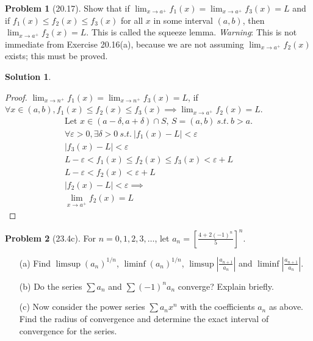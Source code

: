 \documentclass[12pt]{article}
\theoremstyle{definition} %
\newtheorem{solution}{Solution}
\newtheorem{problem}{Problem}
\theoremstyle{plain} %
\begin{document}
\begin{problem}[20.17]
    Show that if \( \lim_{x \to a^+} f_1(x) = \lim_{x \to a^+} f_3(x) = L \) and if \( f_1(x) \leq f_2(x) \leq f_3(x) \) for all \( x \) in some interval \( (a, b) \), then \( \lim_{x \to a^+} f_2(x) = L \). This is called the squeeze lemma. \textit{Warning}: This is not immediate from Exercise 20.16(a), because we are not assuming \( \lim_{x \to a^+} f_2(x) \) exists; this must be proved.
\end{problem}
\begin{solution}
    \begin{proof}
        \(\lim_{x \to n^{+}} f_1(x)=\lim_{x \to n^{+}}f_{3}(x)=L\), if \(\forall x \in (a,b), f_1(x) \leq f_2(x) \leq f_3(x)\implies \lim_{x \to a^{+}} f_2(x)=L\). \begin{align}
           \text{Let } x\in (a-\delta ,a+\delta )\cap S \text{, } S = (a,b) \ s.t. \ b>a. \\[10pt] 
           \forall \varepsilon>0, \exists \delta >0 \ s.t. \ \left\vert f_1(x) - L \right\vert <\varepsilon \\[10pt] 
           \left\vert f_{3}(x) - L  \right\vert < \varepsilon \\[10pt] 
           L-\varepsilon<f_1(x) \leq f_2(x) \leq f_3(x) <\varepsilon+L \\[10pt] 
           L-\varepsilon< f_2(x) < \varepsilon+L \\[10pt] 
           \left\vert f_2(x)-L \right\vert <\varepsilon \implies \\[10pt] 
           \lim_{x \to a^{+}}f_2(x)=L 
        \end{align}  
    \end{proof}
\end{solution}
\begin{problem}[23.4c]
    For \( n = 0, 1, 2, 3, \dots \), let \( a_n = \left[ \frac{4 + 2 (-1)^n}{5} \right]^n \).

\begin{enumerate}
    \item[(a)] Find \( \limsup (a_n)^{1/n} \), \( \liminf (a_n)^{1/n} \), \( \limsup \left| \frac{a_{n+1}}{a_n} \right| \) and \( \liminf \left| \frac{a_{n+1}}{a_n} \right| \).
    \item[(b)] Do the series \( \sum a_n \) and \( \sum (-1)^n a_n \) converge? Explain briefly.
    \item[(c)] Now consider the power series \( \sum a_n x^n \) with the coefficients \( a_n \) as above. Find the radius of convergence and determine the exact interval of convergence for the series.
\end{enumerate}
\end{problem}
\end{document}
